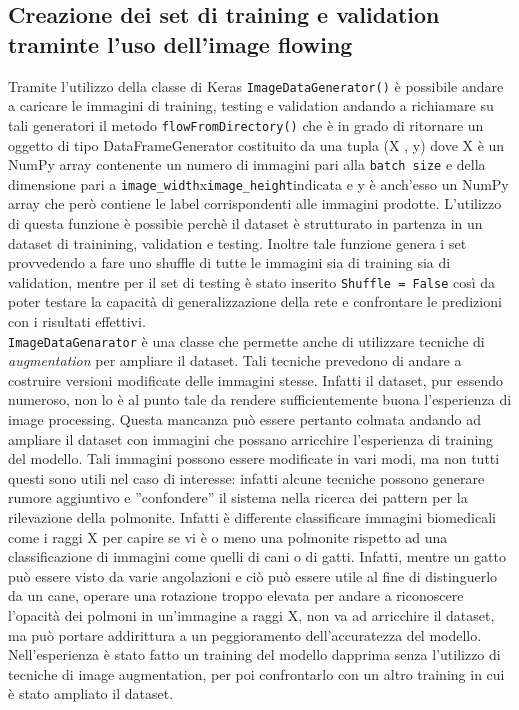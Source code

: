 \subsection{Creazione dei set di training e validation traminte l’uso dell’image flowing}
Tramite l’utilizzo della classe di Keras  \lstinline{ImageDataGenerator()} è possibile andare a caricare le
 immagini di training, testing e validation andando a richiamare su tali generatori il metodo  
 \lstinline{flowFromDirectory()} che è in grado di ritornare un oggetto di tipo DataFrameGenerator
 costituito da una tupla (X , y) dove X è un NumPy array contenente un numero di immagini pari alla 
   \lstinline{batch size} e della dimensione pari a  \lstinline{image_width}x\lstinline{image_height}indicata e 
   y è anch’esso
    un NumPy array che però contiene le label corrispondenti alle immagini prodotte. L’utilizzo di
     questa funzione è possibie perchè il dataset è strutturato in partenza in un dataset di trainining, 
     validation e testing. Inoltre tale funzione genera i set provvedendo a fare uno shuffle di tutte le immagini
      sia di training sia di  validation, mentre per il set di testing è stato inserito  \lstinline{Shuffle = False}
       così da poter testare la capacità di generalizzazione della rete e confrontare le predizioni con i risultati 
       effettivi. \\
 \lstinline{ImageDataGenarator} è una classe che permette anche di utilizzare tecniche di \emph{augmentation}
  per ampliare il dataset. Tali tecniche prevedono di andare a costruire versioni modificate delle immagini stesse. 
  Infatti il dataset, pur essendo numeroso, non lo è al punto tale da rendere sufficientemente buona l’esperienza
   di image processing. Questa mancanza può essere pertanto colmata andando ad ampliare il dataset con immagini
    che possano arricchire l’esperienza di training del modello. Tali immagini possono essere modificate in vari
     modi, ma non tutti questi sono utili nel caso di interesse: infatti alcune tecniche possono generare rumore 
     aggiuntivo e ''confondere'' il sistema nella ricerca dei pattern per la rilevazione della polmonite.
     Infatti è differente classificare immagini biomedicali come i raggi
     X per capire se vi è o meno una polmonite rispetto ad una classificazione di immagini come quelli di 
     cani o di gatti. Infatti, mentre un gatto può essere visto da varie angolazioni e ciò può essere
      utile al fine di distinguerlo da un cane, operare una rotazione troppo elevata per andare a riconoscere 
      l’opacità dei polmoni in un’immagine a raggi X, non va ad arricchire il dataset, ma può portare
       addirittura a un peggioramento dell’accuratezza del modello. Nell’esperienza è stato fatto un
        training del modello dapprima senza l’utilizzo di tecniche di image augmentation, per poi confrontarlo
         con un altro training in cui è stato ampliato il dataset. \\

